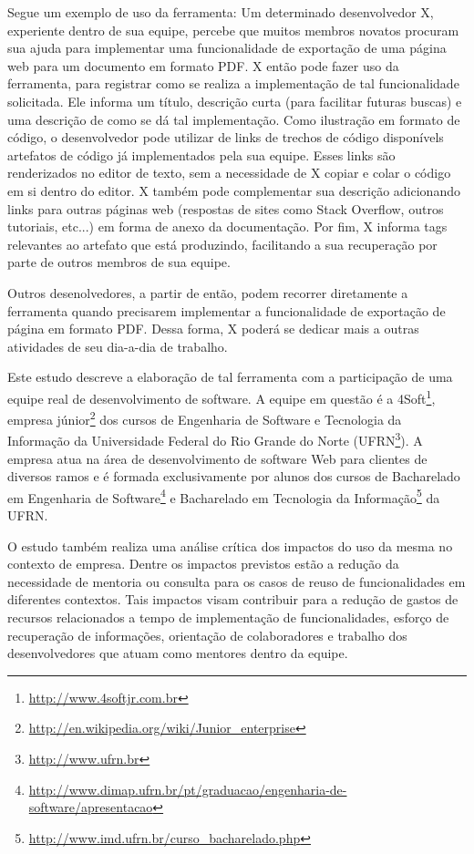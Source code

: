 Segue um exemplo de uso da ferramenta: Um determinado desenvolvedor X, experiente dentro de sua equipe, percebe que muitos membros novatos procuram sua ajuda para implementar uma funcionalidade de exportação de uma página web para um documento em formato PDF. X então pode fazer uso da ferramenta, para registrar como se realiza a implementação de tal funcionalidade solicitada. Ele informa um título, descrição curta (para facilitar futuras buscas) e uma descrição de como se dá tal implementação. Como ilustração em formato de código, o desenvolvedor pode utilizar de links de trechos de código disponívels artefatos de código já implementados pela sua equipe. Esses links são renderizados no editor de texto, sem a necessidade de X copiar e colar o código em si dentro do editor. X também pode complementar sua descrição adicionando links para outras páginas web (respostas de sites como Stack Overflow, outros tutoriais, etc...) em forma de anexo da documentação. Por fim, X informa tags relevantes ao artefato que está produzindo, facilitando a sua recuperação por parte de outros membros de sua equipe.

Outros desenolvedores, a partir de então, podem recorrer diretamente a ferramenta quando precisarem implementar a funcionalidade de exportação de página em formato PDF. Dessa forma, X poderá se dedicar mais a outras atividades de seu dia-a-dia de trabalho.

Este estudo descreve a elaboração de tal ferramenta com a participação de uma equipe real de desenvolvimento de software. A equipe em questão é a 4Soft\footnote{\url{http://www.4softjr.com.br}}, empresa júnior\footnote{\url{http://en.wikipedia.org/wiki/Junior_enterprise}} dos cursos de Engenharia de Software e Tecnologia da Informação da Universidade Federal do Rio Grande do Norte (UFRN\footnote{\url{http://www.ufrn.br}}). A empresa atua na área de desenvolvimento de software Web para clientes de diversos ramos e é formada exclusivamente por alunos dos cursos de Bacharelado em Engenharia de Software\footnote{\url{http://www.dimap.ufrn.br/pt/graduacao/engenharia-de-software/apresentacao}} e Bacharelado em Tecnologia da Informação\footnote{\url{http://www.imd.ufrn.br/curso_bacharelado.php}} da UFRN.

O estudo também realiza uma análise crítica dos impactos do uso da mesma no contexto de empresa. Dentre os impactos previstos estão a redução da necessidade de mentoria ou consulta para os casos de  reuso de funcionalidades em diferentes contextos. Tais impactos visam contribuir para a redução de gastos de recursos relacionados a tempo de implementação de funcionalidades, esforço de recuperação de informações, orientação de colaboradores e trabalho dos desenvolvedores que atuam como mentores dentro da equipe.


